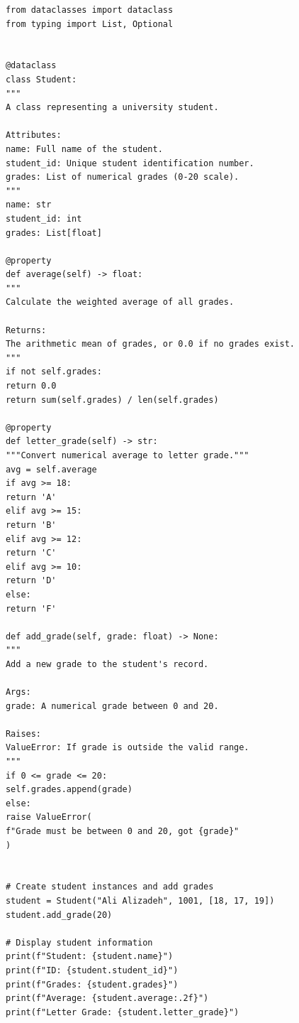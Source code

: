 \documentclass{matinbook}
\begin{document}
    \begin{latin}
        \begin{verbatim}
            from dataclasses import dataclass
            from typing import List, Optional
            
            
            @dataclass
            class Student:
            """
            A class representing a university student.
            
            Attributes:
            name: Full name of the student.
            student_id: Unique student identification number.
            grades: List of numerical grades (0-20 scale).
            """
            name: str
            student_id: int
            grades: List[float]
            
            @property
            def average(self) -> float:
            """
            Calculate the weighted average of all grades.
            
            Returns:
            The arithmetic mean of grades, or 0.0 if no grades exist.
            """
            if not self.grades:
            return 0.0
            return sum(self.grades) / len(self.grades)
            
            @property
            def letter_grade(self) -> str:
            """Convert numerical average to letter grade."""
            avg = self.average
            if avg >= 18:
            return 'A'
            elif avg >= 15:
            return 'B'
            elif avg >= 12:
            return 'C'
            elif avg >= 10:
            return 'D'
            else:
            return 'F'
            
            def add_grade(self, grade: float) -> None:
            """
            Add a new grade to the student's record.
            
            Args:
            grade: A numerical grade between 0 and 20.
            
            Raises:
            ValueError: If grade is outside the valid range.
            """
            if 0 <= grade <= 20:
            self.grades.append(grade)
            else:
            raise ValueError(
            f"Grade must be between 0 and 20, got {grade}"
            )
            
            
            # Create student instances and add grades
            student = Student("Ali Alizadeh", 1001, [18, 17, 19])
            student.add_grade(20)
            
            # Display student information
            print(f"Student: {student.name}")
            print(f"ID: {student.student_id}")
            print(f"Grades: {student.grades}")
            print(f"Average: {student.average:.2f}")
            print(f"Letter Grade: {student.letter_grade}")
        \end{verbatim}
    \end{latin}
    \label{code:oop}
    
\end{document}
